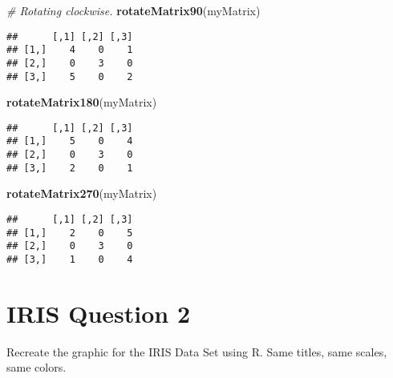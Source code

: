 \documentclass[
]{article}
\newenvironment{Shaded}{\begin{snugshade}}{\end{snugshade}}
\newcommand{\CommentTok}[1]{\textcolor[rgb]{0.56,0.35,0.01}{\textit{#1}}}
\newcommand{\DataTypeTok}[1]{\textcolor[rgb]{0.13,0.29,0.53}{#1}}
\newcommand{\DecValTok}[1]{\textcolor[rgb]{0.00,0.00,0.81}{#1}}
\newcommand{\FloatTok}[1]{\textcolor[rgb]{0.00,0.00,0.81}{#1}}
\newcommand{\KeywordTok}[1]{\textcolor[rgb]{0.13,0.29,0.53}{\textbf{#1}}}
\newcommand{\NormalTok}[1]{#1}
\newcommand{\OperatorTok}[1]{\textcolor[rgb]{0.81,0.36,0.00}{\textbf{#1}}}
\newcommand{\StringTok}[1]{\textcolor[rgb]{0.31,0.60,0.02}{#1}}
\begin{document}
\begin{Shaded}
\begin{Highlighting}[]
\begin{Shaded}
\begin{Highlighting}[]
\CommentTok{# Rotating clockwise.}
\KeywordTok{rotateMatrix90}\NormalTok{(myMatrix)}
\end{Highlighting}
\end{Shaded}

\begin{verbatim}
##      [,1] [,2] [,3]
## [1,]    4    0    1
## [2,]    0    3    0
## [3,]    5    0    2
\end{verbatim}

\begin{Shaded}
\begin{Highlighting}[]
\KeywordTok{rotateMatrix180}\NormalTok{(myMatrix)}
\end{Highlighting}
\end{Shaded}

\begin{verbatim}
##      [,1] [,2] [,3]
## [1,]    5    0    4
## [2,]    0    3    0
## [3,]    2    0    1
\end{verbatim}

\begin{Shaded}
\begin{Highlighting}[]
\KeywordTok{rotateMatrix270}\NormalTok{(myMatrix)}
\end{Highlighting}
\end{Shaded}

\begin{verbatim}
##      [,1] [,2] [,3]
## [1,]    2    0    5
## [2,]    0    3    0
## [3,]    1    0    4
\end{verbatim}

\hypertarget{iris-question-2}{%
\section{IRIS Question 2}\label{iris-question-2}}

Recreate the graphic for the IRIS Data Set using R. Same titles, same
scales, same colors.

\begin{Shaded}
\end{Shaded}


\end{Highlighting}
\end{Shaded}
\end{document}
